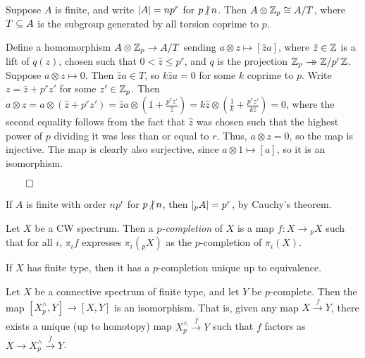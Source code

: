 \documentclass{MetricNotes2023}
\newcommand{\surj}{\rightarrow\mathrel{\mkern-14mu}\rightarrow}
\def\subq{\ensuremath\subseteq}
\def\inte{\ensuremath\mathbb{Z}}
\def\done{\begin{flushright}\vspace{-4.35ex}\(\qed\)\end{flushright}}
\def\nvert{\ensuremath\hspace{-0.5ex}\not\vert\hspace{0.5ex}}
\begin{document}
\begin{lemma}\label{2504031247}
Suppose \(A\) is finite, and write \(\lvert A\rvert=np^r\) for \(p\nvert n\). Then \(A\otimes\inte_p\cong A/T\), where \(T\subq A\) is the subgroup generated by all torsion coprime to \(p\).
\end{lemma}

\begin{ourproof}
Define a homomorphism \(A\otimes\inte_p\to A/T\) sending \(a\otimes z \mapsto [\hat za]\), where \(\hat z\in \inte\) is a lift of \(q(z)\), chosen such that \(0 < \hat z \leq p^{r}\), and \(q\) is the projection \(\inte_p \surj \inte/p^r\inte\). Suppose \(a\otimes z\mapsto 0\).  Then \(\hat za\in T\), so \(k\hat za=0\) for some \(k\) coprime to \(p\). Write \(z=\hat z + p^rz'\) for some \(z'\in\inte_p\). Then \(a\otimes z = a\otimes(\hat z + p^r z')=\hat za\otimes(1 + \frac{p^rz'}{\hat z})=k\hat z\otimes(\frac{1}{k}+\frac{p^rz'}{k\hat z})=0\), where the second  equality follows from the fact that \(\hat z\) was chosen such that the highest power of \(p\) dividing it was less than or equal to \(r\).%
\text{ }Thus, \(a\otimes z = 0\), so the map is injective. The map is clearly also surjective, since \(a\otimes 1 \mapsto [a]\), so it is an isomorphism. \done
\end{ourproof}

\begin{remark}
If \(A\) is finite with order \(np^r\) for \(p\nvert n\), then \(\lvert\text{}_pA\rvert=p^r\), by Cauchy's theorem. 
\end{remark}

\begin{definition}
Let \(X\) be a CW spectrum. Then a \textit{\(p\)-completion} of \(X\) is a map \(f : X \to \text{}_pX\) such that for all \(i\), \(\pi_if\) expresses \(\pi_i(\text{}_pX)\) as the \(p\)-completion of \(\pi_i(X)\).
\end{definition}

\begin{theorem}
If \(X\) has finite type, then it has a \(p\)-completion unique up to equivalence. 
\end{theorem}

\begin{theorem}\label{2504180925}
Let \(X\) be a connective spectrum of finite type, and let \(Y\) be \(p\)-complete. Then the map \([X^\wedge_p, Y]\to [X, Y]\) is an isomorphism. That is, given any map \(X \xrightarrow{f} Y\), there exists a unique (up to homotopy) map \(X^\wedge_p \xrightarrow{\overline f} Y\) such that \(f\) factors as \(X \to X^\wedge_p \xrightarrow{\overline f} Y\). 
\end{theorem}
\end{document}
